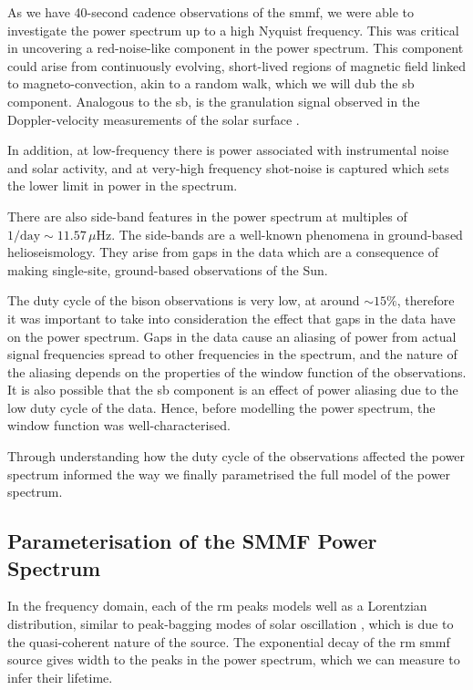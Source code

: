 As we have 40-second cadence observations of the \gls{smmf}, we were able to investigate the power spectrum up to a high Nyquist frequency. This was critical in uncovering a red-noise-like component in the power spectrum. This component could arise from continuously evolving, short-lived regions of magnetic field linked to magneto-convection, akin to a random walk, which we will dub the \gls{sb} component. Analogous to the \gls{sb}, is the granulation signal observed in the Doppler-velocity measurements of the solar surface \citep{basu_asteroseismic_2017}. 

In addition, at low-frequency there is power associated with instrumental noise and solar activity, and at very-high frequency shot-noise is captured which sets the lower limit in power in the spectrum. 

There are also side-band features in the power spectrum at multiples of $1/\mathrm{day} \sim 11.57 \, \mu\mathrm{Hz}$. The side-bands are a well-known phenomena in ground-based helioseismology. They arise from gaps in the data which are a consequence of making single-site, ground-based observations of the Sun.

The duty cycle of the \gls{bison} observations is very low, at around $\sim 15\%$, therefore it was important to take into consideration the effect that gaps in the data have on the power spectrum. Gaps in the data cause an aliasing of power from actual signal frequencies spread to other frequencies in the spectrum, and the nature of the aliasing depends on the properties of the window function of the observations. It is also possible that the \gls{sb} component is an effect of power aliasing due to the low duty cycle of the data. Hence, before modelling the power spectrum, the window function was well-characterised.

Through understanding how the duty cycle of the observations affected the power spectrum informed the way we finally parametrised the full model of the power spectrum.


\subsection{Parameterisation of the SMMF Power Spectrum}

In the frequency domain, each of the \gls{rm} peaks models well as a Lorentzian distribution, similar to peak-bagging modes of solar oscillation \citep{handberg_bayesian_2011, davies_low-frequency_2014}, which is due to the quasi-coherent nature of the source. The exponential decay of the \gls{rm} \gls{smmf} source gives width to the peaks in the power spectrum, which we can measure to infer their lifetime.

